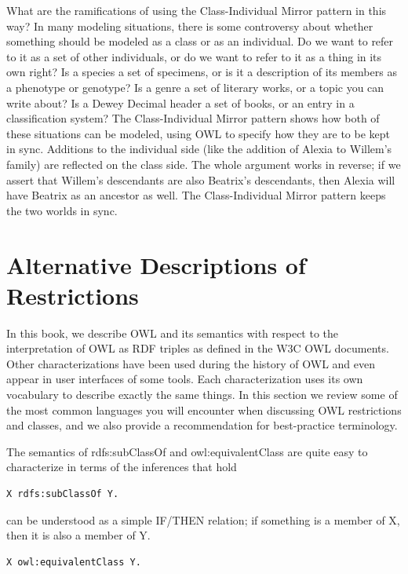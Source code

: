 What are the ramifications of using the Class-Individual Mirror pattern in this way? 
In many modeling situations, there is some controversy about whether something should be 
modeled as a class or as an individual.  Do we want to refer to it as a set of other individuals, 
or do we want to refer to it as a thing in its own right?  Is a species a set of specimens, or
is it a description of its members as a phenotype or genotype?  Is a genre a set of literary 
works, or a topic you can write about?  Is a Dewey Decimal header a set of books, or an entry
in a classification system?  The Class-Individual Mirror pattern shows how both of these 
situations can be modeled, using OWL to specify how they are to be kept in sync.  Additions 
to the individual side (like the addition of Alexia to Willem's family) are reflected on the 
class side.  The whole argument works in reverse; if we assert that Willem's descendants are 
also Beatrix's descendants, then Alexia will have Beatrix as an ancestor as well.  The Class-Individual 
Mirror pattern keeps the two worlds in sync. 

\section{Alternative Descriptions of Restrictions}

In this book, we describe OWL and its semantics with respect to the
interpretation of OWL as RDF triples as defined in the W3C OWL
documents. Other characterizations have been used during the history of
OWL and even appear in user interfaces of some tools. Each
characterization uses its own vocabulary to describe exactly the same
things. In this section we review some of the most common
languages you will encounter when discussing OWL restrictions and
classes, and we also provide a recommendation for best-practice
terminology.

The semantics of rdfs:subClassOf and owl:equivalentClass are quite easy
to characterize in terms of the inferences that hold

\begin{lstlisting}
X rdfs:subClassOf Y.
\end{lstlisting}

can be understood as a simple IF/THEN relation; if something is a member
of X, then it is also a member of Y.

\begin{lstlisting}
X owl:equivalentClass Y.
\end{lstlisting}

